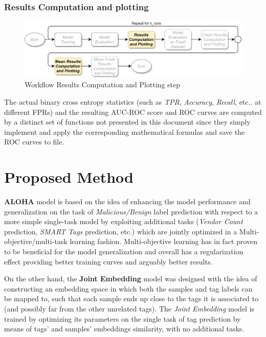 \documentclass[pdfa%
,cucitura%
]{toptesi}
\begin{document}
\subsection{Results Computation and plotting}
\begin{figure}[h!]
	\centering
	\includegraphics[width=\textwidth]{./images/workflow_results.png}
	\caption[Results Computation and plotting workflow step]{Workflow Results Computation and Plotting step}
	\label{fig:workflow_results}
\end{figure}

The actual binary cross entropy statistics (such as \textit{TPR}, \textit{Accuracy}, \textit{Recall}, etc.. at different FPRs) and the resulting AUC-ROC score and ROC curves are computed by a distinct set of functions not presented in this document since they simply implement and apply the corresponding mathematical formulas and save the ROC curves to file.

\color{Black}
\chapter{Proposed Method}
\textbf{ALOHA} model is based on the idea of enhancing the model performance and generalization on the task of \textit{Malicious/Benign} label prediction with respect to a more simple single-task model by exploiting additional tasks (\textit{Vendor Count} prediction, \textit{SMART Tags} prediction, etc.) which are jointly optimized in a Multi-objective/multi-task learning fashion. Multi-objective learning has in fact proven to be beneficial for the model generalization and overall has a regularization effect providing better training curves and arguably better results.

On the other hand, the \textbf{Joint Embedding} model was designed with the idea of constructing an embedding space in which both the samples and tag labels can be mapped to, such that each sample ends up close to the tags it is associated to (and possibly far from the other unrelated tags). The \textit{Joint Embedding} model is trained by optimizing its parameters on the single task of tag prediction by means of tags' and samples' embeddings similarity, with no additional tasks.
\end{document}
